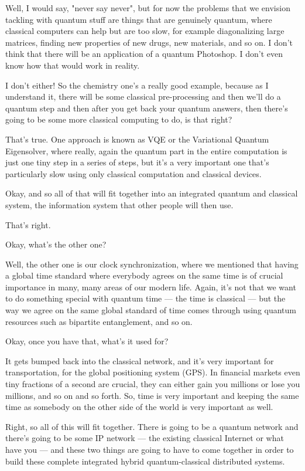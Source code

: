 \mmm Well, I would say, "never say never", but for now the problems that we envision tackling with quantum stuff are things that are genuinely quantum, where classical computers can help but are too slow, for example diagonalizing large matrices, finding new properties of new drugs, new materials, and so on. I don't think that there will be an application of a quantum Photoshop. I don't even know how that would work in reality.

\rrr I don't either! So the chemistry one's a really good example, because as I understand it, there will be some classical pre-processing and then we'll do a quantum step and then after you get back your quantum answers, then there's going to be some more classical computing to do, is that right?

\mmm That's true. One approach is known as VQE or the Variational Quantum Eigensolver, where really, again the quantum part in the entire computation is just one tiny step in a series of steps, but it's a very important one that's particularly slow using only classical computation and classical devices.

\rrr Okay, and so all of that will fit together into an integrated quantum and classical system, the information system that other people will then use.

\mmm That's right.

\rrr Okay, what's the other one?

\mmm Well, the other one is our clock synchronization, where we mentioned that having a global time standard where everybody agrees on the same time is of crucial importance in many, many areas of our modern life. Again, it's not that we want to do something special with quantum time --- the time is classical --- but the way we agree on the same global standard of time comes through using quantum resources such as bipartite entanglement, and so on.

\rrr Okay, once you have that, what's it used for?

\mmm It gets bumped back into the classical network, and it's very important for transportation, for the global positioning system (GPS). In financial markets even tiny fractions of a second are crucial, they can either gain you millions or lose you millions, and so on and so forth. So, time is very important and keeping the same time as somebody on the other side of the world is very important as well.

\rrr Right, so all of this will fit together. There is going to be a quantum network and there's going to be some IP network --- the existing classical Internet or what have you --- and these two things are going to have to come together in order to build these complete integrated hybrid quantum-classical distributed systems.

